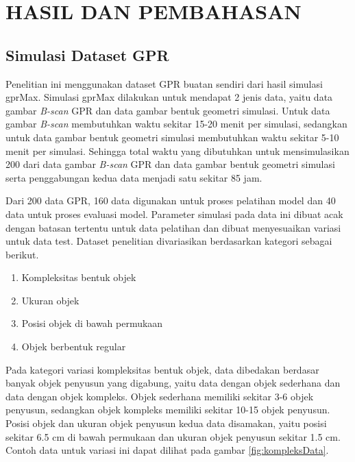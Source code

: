 \chapter{HASIL DAN PEMBAHASAN}
\label{chap:hasilpembahasan}

\section{Simulasi Dataset GPR}
\label{sec:simulasiDatasetGPR}

Penelitian ini menggunakan dataset GPR buatan sendiri dari hasil simulasi gprMax. 
Simulasi gprMax dilakukan untuk mendapat 2 jenis data, yaitu data gambar \emph{B-scan} GPR dan data gambar bentuk geometri simulasi. 
Untuk data gambar \emph{B-scan} membutuhkan waktu sekitar 15-20 menit per simulasi, sedangkan untuk data gambar bentuk geometri simulasi membutuhkan waktu sekitar 5-10 menit per simulasi. 
Sehingga total waktu yang dibutuhkan untuk mensimulasikan 200 dari data gambar \emph{B-scan} GPR dan data gambar bentuk geometri simulasi serta penggabungan kedua data menjadi satu sekitar 85 jam.

Dari 200 data GPR, 160 data digunakan untuk proses pelatihan model dan 40 data untuk proses evaluasi model. 
Parameter simulasi pada data ini dibuat acak dengan batasan tertentu untuk data pelatihan dan dibuat menyesuaikan variasi untuk data test. 
Dataset penelitian divariasikan berdasarkan kategori sebagai berikut.

\begin{enumerate}[nolistsep]

  \item Kompleksitas bentuk objek

  \item Ukuran objek
  
  \item Posisi objek di bawah permukaan

  \item Objek berbentuk regular
\end{enumerate}

Pada kategori variasi kompleksitas bentuk objek, data dibedakan berdasar banyak objek penyusun yang digabung, yaitu data dengan objek sederhana dan data dengan objek kompleks. 
Objek sederhana memiliki sekitar 3-6 objek penyusun, sedangkan objek kompleks memiliki sekitar 10-15 objek penyusun. 
Posisi objek dan ukuran objek penyusun kedua data disamakan, yaitu posisi sekitar 6.5 cm di bawah permukaan dan ukuran objek penyusun sekitar 1.5 cm. 
Contoh data untuk variasi ini dapat dilihat pada gambar \ref{fig:kompleksData}.

